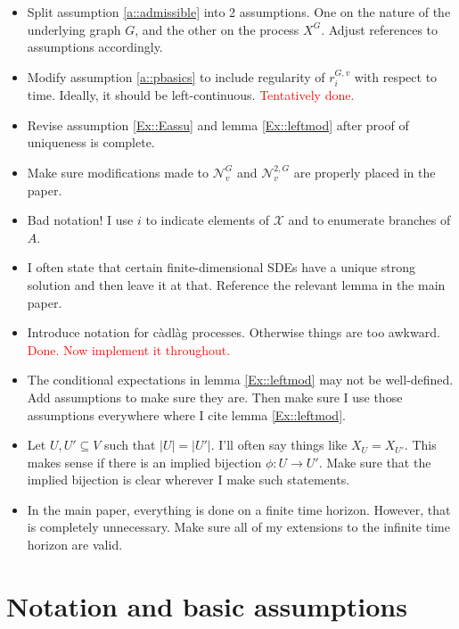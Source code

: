 \documentclass[12pt]{article}
\newcommand{\mc}{\mathcal}
\newcommand{\ra}{\rightarrow}
\newcommand{\tr}{\textcolor{red}}
\newcommand{\sta}{\mc{X}}							%
\newcommand{\gneigh}[2]{\mc{N}^{#1}_{#2}}			%
\newcommand{\dgneigh}[2]{\mc{N}^{2,#1}_{#2}}		%
\newcommand{\Xf}{X}									%
\newcommand{\rate}{r}								%
\newcommand{\vind}[1]{_{#1}}						%
\newcommand{\gind}[1]{^{#1}}						%
\newcommand{\stpara}[1]{_{#1}}						%
\newcommand{\gvpara}[2]{^{#1,#2}}					%
\begin{document}
\begin{itemize}
\item Split assumption \ref{a::admissible} into 2 assumptions. One on the nature of the underlying graph \(G\), and the other on the process \(\Xf\gind{G}\). Adjust references to assumptions accordingly.

\item Modify assumption \ref{a::pbasics} to include regularity of \(\rate\gvpara{G}{v}\stpara{i}\) with respect to time. Ideally, it should be left-continuous. \tr{Tentatively done.}

\item Revise assumption \ref{Ex::Eassu} and lemma \ref{Ex::leftmod} after proof of uniqueness is complete.

\item Make sure modifications made to \(\gneigh{G}{v}\) and \(\dgneigh{G}{v}\) are properly placed in the paper.

\item Bad notation! I use \(i\) to indicate elements of \(\sta\) and to enumerate branches of \(A\).

\item I often state that certain finite-dimensional SDEs have a unique strong solution and then leave it at that. Reference the relevant lemma in the main paper.

\item Introduce notation for c\`adl\`ag processes. Otherwise things are too awkward. \tr{Done. Now implement it throughout.}

\item The conditional expectations in lemma \ref{Ex::leftmod} may not be well-defined. Add assumptions to make sure they are. Then make sure I use those assumptions everywhere where I cite lemma \ref{Ex::leftmod}.

\item Let \(U,U'\subseteq V\) such that \(|U| = |U'|\). I'll often say things like \(\Xf\vind{U} = \Xf\vind{U'}\). This makes sense if there is an implied bijection \(\phi:U \ra U'\). Make sure that the implied bijection is clear wherever I make such statements.

\item In the main paper, everything is done on a finite time horizon. However, that is completely unnecessary. Make sure all of my extensions to the infinite time horizon are valid.
\end{itemize}


\section{Notation and basic assumptions}
\label{not}
\end{document}

